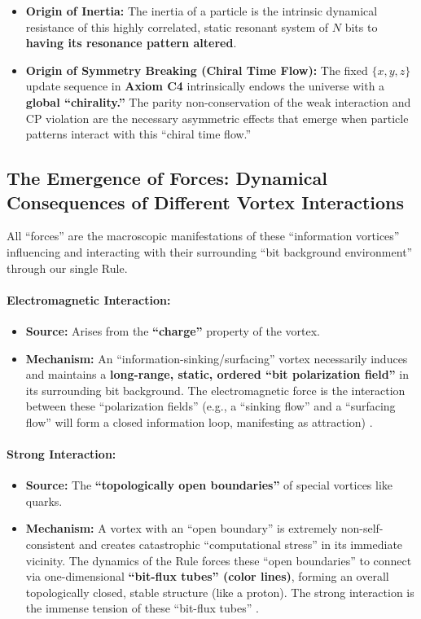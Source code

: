 \documentclass[11pt, a4paper]{article}
\begin{document}
\begin{itemize}
    \item \textbf{Origin of Inertia:} The inertia of a particle is the intrinsic dynamical resistance of this highly correlated, static resonant system of $N$ bits to \textbf{having its resonance pattern altered}.

    \item \textbf{Origin of Symmetry Breaking (Chiral Time Flow):} The fixed $\{x, y, z\}$ update sequence in \textbf{Axiom C4} intrinsically endows the universe with a \textbf{global ``chirality.''} The parity non-conservation of the weak interaction and CP violation are the necessary asymmetric effects that emerge when particle patterns interact with this ``chiral time flow.''
\end{itemize}

\subsection{The Emergence of Forces: Dynamical Consequences of Different Vortex Interactions}

All ``forces'' are the macroscopic manifestations of these ``information vortices'' influencing and interacting with their surrounding ``bit background environment'' through our single Rule.

\paragraph{Electromagnetic Interaction:}
\begin{itemize}
    \item \textbf{Source:} Arises from the \textbf{``charge''} property of the vortex.
    \item \textbf{Mechanism:} An ``information-sinking/surfacing'' vortex necessarily induces and maintains a \textbf{long-range, static, ordered ``bit polarization field''} in its surrounding bit background. The electromagnetic force is the interaction between these ``polarization fields'' (e.g., a ``sinking flow'' and a ``surfacing flow'' will form a closed information loop, manifesting as attraction) \cite{Einstein1905}.
\end{itemize}

\paragraph{Strong Interaction:}
\begin{itemize}
    \item \textbf{Source:} The \textbf{``topologically open boundaries''} of special vortices like quarks.
    \item \textbf{Mechanism:} A vortex with an ``open boundary'' is extremely non-self-consistent and creates catastrophic ``computational stress'' in its immediate vicinity. The dynamics of the Rule forces these ``open boundaries'' to connect via one-dimensional \textbf{``bit-flux tubes'' (color lines)}, forming an overall topologically closed, stable structure (like a proton). The strong interaction is the immense tension of these ``bit-flux tubes'' \cite{Skyrme1961}.
\end{itemize}
\end{document}
